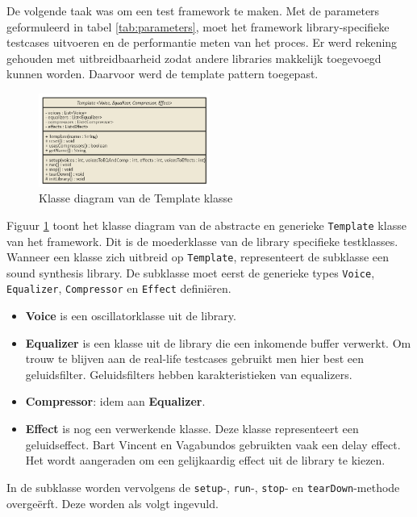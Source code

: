 De volgende taak was om een test framework te maken. Met de parameters geformuleerd in tabel \ref{tab:parameters}, moet het framework library-specifieke testcases uitvoeren en de performantie meten van het proces. Er werd rekening gehouden met uitbreidbaarheid zodat andere libraries makkelijk toegevoegd kunnen worden. Daarvoor werd de template pattern toegepast.

\begin{figure}
  \centering
    \includegraphics[width=0.5\textwidth]{imgs/nomnoml.png}
  \caption{Klasse diagram van de Template klasse}
  \label{fig:template}
\end{figure}

Figuur \ref{fig:template} toont het klasse diagram van de abstracte en generieke \verb+Template+ klasse van het framework. Dit is de moederklasse van de library specifieke testklasses. Wanneer een klasse zich uitbreid op \verb+Template+, representeert de subklasse een sound synthesis library. De subklasse moet eerst de generieke types \verb+Voice+, \verb+Equalizer+, \verb+Compressor+ en \verb+Effect+ definiëren.

\begin{itemize}
	\item \textbf{Voice} is een oscillatorklasse uit de library.
	\item \textbf{Equalizer} is een klasse uit de library die een inkomende buffer verwerkt. Om trouw te blijven aan de real-life testcases gebruikt men hier best een geluidsfilter. Geluidsfilters hebben karakteristieken van equalizers.
	\item \textbf{Compressor}: idem aan \textbf{Equalizer}.
	\item \textbf{Effect} is nog een verwerkende klasse. Deze klasse representeert een geluidseffect. Bart Vincent en Vagabundos gebruikten vaak een delay effect. \autocite{bartvincent} \autocite{vagabundos} Het wordt aangeraden om een gelijkaardig effect uit de library te kiezen.
\end{itemize}

 In de subklasse worden vervolgens de \verb+setup+-, \verb+run+-, \verb+stop+- en \verb+tearDown+-methode overgeërft. Deze worden als volgt ingevuld.

